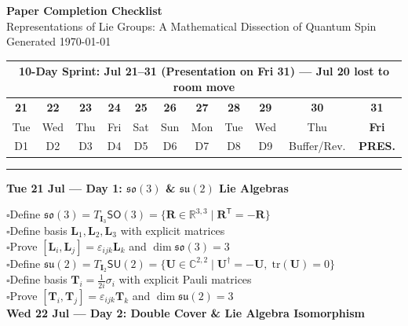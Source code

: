 \documentclass[11pt]{article}
\newcommand{\todo}{\textcolor{pending}{\Large $\square$}}
\newcommand{\secname}[1]{\vspace{1em}\noindent\textcolor{sectioncolor}{\Large\bfseries #1}}
\newcommand{\so}{\mathfrak{so}}
\newcommand{\su}{\mathfrak{su}}
\newcommand{\SO}{\mathsf{SO}}
\newcommand{\SU}{\mathsf{SU}}
\newcommand{\C}{\mathbb{C}}
\newcommand{\R}{\mathbb{R}}
\newcommand{\transp}{^{\mathsf{T}}}
\newcommand{\herm}{^{\dagger}}
\newcommand{\st}{\mid}
\newcommand{\tr}{\mathrm{tr}}
\begin{document}
\begin{center}
{\Huge\bfseries Paper Completion Checklist}\\[0.5em]
{\Large Representations of Lie Groups: A Mathematical Dissection of Quantum Spin}\\[0.5em]
{\normalsize Generated \today}\\[1em]

\setlength{\tabcolsep}{5pt}
\begin{tabular}{|c|c|c|c|c|c|c|c|c|c|c|}
\hline
\multicolumn{11}{|c|}{\textbf{10-Day Sprint: Jul 21--31 (Presentation on Fri 31) --- Jul 20 lost to room move}} \\
\hline
\textbf{21} & \textbf{22} & \textbf{23} & \textbf{24} & \textbf{25} & \textbf{26} & \textbf{27} & \textbf{28} & \textbf{29} & \textbf{30} & \textcolor{deadline}{\textbf{31}} \\
Tue & Wed & Thu & Fri & Sat & Sun & Mon & Tue & Wed & Thu & \textcolor{deadline}{\textbf{Fri}} \\
\hline
D1 & D2 & D3 & D4 & D5 & D6 & D7 & D8 & D9 & Buffer/Rev. & \textcolor{deadline}{\textbf{PRES.}} \\
\hline
\end{tabular}
\end{center}

\vspace{1em}
\hrule
\vspace{1em}

\secname{Tue 21 Jul --- Day 1: \texorpdfstring{$\so(3)$}{so(3)} \& \texorpdfstring{$\su(2)$}{su(2)} Lie Algebras}

\todo\quad Define $\so(3)=T_{\bm I_3}\SO(3)=\{\bm R\in\R^{3,3}\st\bm R\transp=-\bm R\}$\\
\todo\quad Define basis $\bm L_1,\bm L_2,\bm L_3$ with explicit matrices\\
\todo\quad Prove $[\bm L_i,\bm L_j]=\varepsilon_{ijk}\bm L_k$ and $\dim\so(3)=3$\\
\todo\quad Define $\su(2)=T_{\bm I_2}\SU(2)=\{\bm U\in\C^{2,2}\st\bm U\herm=-\bm U,\;\tr(\bm U)=0\}$\\
\todo\quad Define basis $\bm T_i=\frac{1}{2i}\sigma_i$ with explicit Pauli matrices\\
\todo\quad Prove $[\bm T_i,\bm T_j]=\varepsilon_{ijk}\bm T_k$ and $\dim\su(2)=3$\\

\secname{Wed 22 Jul --- Day 2: Double Cover \& Lie Algebra Isomorphism}
\end{document}
